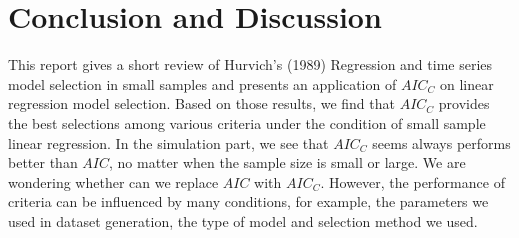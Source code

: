 \section{Conclusion and Discussion}
This report gives a short review of Hurvich's (1989) Regression and time series model selection in small samples and presents an application of $AIC_C$ on linear regression model selection. Based on those results, we find that $AIC_C$ provides the best selections among various criteria under the condition of small sample linear regression. In the simulation part, we see that $AIC_C$ seems always performs better than $AIC$, no matter when the sample size is small or large. We are wondering whether can we replace $AIC$ with $AIC_C$. However, the performance of criteria can be influenced by many conditions, for example, the parameters we used in dataset generation, the type of model and selection method we used.
